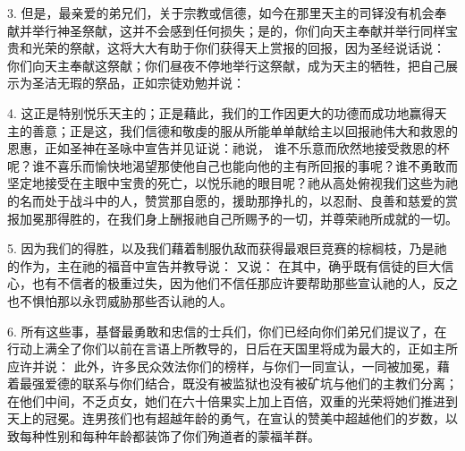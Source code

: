 3. 但是，最亲爱的弟兄们，关于宗教或信德，如今在那里天主的司铎没有机会奉献并举行神圣祭献，这并不会感到任何损失；是的，你们向天主奉献并举行同样宝贵和光荣的祭献，这将大大有助于你们获得天上赏报的回报，因为圣经说话说： 你们向天主奉献这祭献；你们昼夜不停地举行这祭献，成为天主的牺牲，把自己展示为圣洁无瑕的祭品，正如宗徒劝勉并说：\par

4. 这正是特别悦乐天主的；正是藉此，我们的工作因更大的功德而成功地赢得天主的善意；正是这，我们信德和敬虔的服从所能单单献给主以回报祂伟大和救恩的恩惠，正如圣神在圣咏中宣告并见证说：祂说， 谁不乐意而欣然地接受救恩的杯呢？谁不喜乐而愉快地渴望那使他自己也能向他的主有所回报的事呢？谁不勇敢而坚定地接受在主眼中宝贵的死亡，以悦乐祂的眼目呢？祂从高处俯视我们这些为祂的名而处于战斗中的人，赞赏那自愿的，援助那挣扎的，以忍耐、良善和慈爱的赏报加冕那得胜的，在我们身上酬报祂自己所赐予的一切，并尊荣祂所成就的一切。\par

5. 因为我们的得胜，以及我们藉着制服仇敌而获得最艰巨竞赛的棕榈枝，乃是祂的作为，主在祂的福音中宣告并教导说： 又说： 在其中，确乎既有信徒的巨大信心，也有不信者的极重过失，因为他们不信任那应许要帮助那些宣认祂的人，反之也不惧怕那以永罚威胁那些否认祂的人。\par

6. 所有这些事，基督最勇敢和忠信的士兵们，你们已经向你们弟兄们提议了，在行动上满全了你们以前在言语上所教导的，日后在天国里将成为最大的，正如主所应许并说： 此外，许多民众效法你们的榜样，与你们一同宣认，一同被加冕，藉着最强爱德的联系与你们结合，既没有被监狱也没有被矿坑与他们的主教们分离；在他们中间，不乏贞女，她们在六十倍果实上加上百倍，双重的光荣将她们推进到天上的冠冕。连男孩们也有超越年龄的勇气，在宣认的赞美中超越他们的岁数，以致每种性别和每种年龄都装饰了你们殉道者的蒙福羊群。\par

